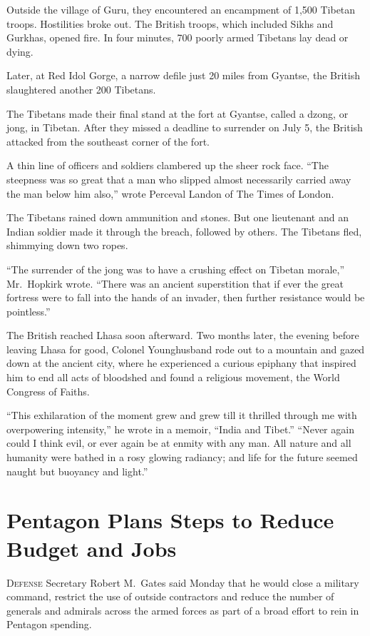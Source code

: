 ﻿\documentclass[12pt]{article}
\begin{document}
Outside the village of Guru, they encountered an encampment of 1,500 Tibetan troops. Hostilities
broke out. The British troops, which included Sikhs and Gurkhas, opened fire. In four minutes, 700
poorly armed Tibetans lay dead or dying.

Later, at Red Idol Gorge, a narrow defile just 20 miles from Gyantse, the British slaughtered
another 200 Tibetans.

The Tibetans made their final stand at the fort at Gyantse, called a dzong, or jong, in Tibetan.
After they missed a deadline to surrender on July 5, the British attacked from the southeast corner
of the fort.

A thin line of officers and soldiers clambered up the sheer rock face. ``The steepness was so great
that a man who slipped almost necessarily carried away the man below him also,'' wrote Perceval
Landon of The Times of London.

The Tibetans rained down ammunition and stones. But one lieutenant and an Indian soldier made it
through the breach, followed by others. The Tibetans fled, shimmying down two ropes.

``The surrender of the jong was to have a crushing effect on Tibetan morale,'' Mr.~Hopkirk wrote.
``There was an ancient superstition that if ever the great fortress were to fall into the hands of
an invader, then further resistance would be pointless.''

The British reached Lhasa soon afterward. Two months later, the evening before leaving Lhasa for
good, Colonel Younghusband rode out to a mountain and gazed down at the ancient city, where he
experienced a curious epiphany that inspired him to end all acts of bloodshed and found a religious
movement, the World Congress of Faiths.

``This exhilaration of the moment grew and grew till it thrilled through me with overpowering
intensity,'' he wrote in a memoir, ``India and Tibet.'' ``Never again could I think evil, or ever
again be at enmity with any man. All nature and all humanity were bathed in a rosy glowing radiancy;
and life for the future seemed naught but buoyancy and light.''

\section{Pentagon Plans Steps to Reduce Budget and Jobs}

\lettrine{D}{efense} Secretary Robert M.~Gates said Monday that he would
close a military command, restrict the use of outside contractors and reduce the number of generals
and admirals across the armed forces as part of a broad effort to rein in Pentagon spending.
\end{document}
